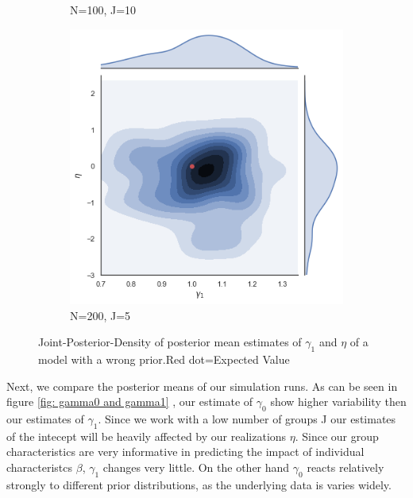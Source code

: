 \begin{figure}[h!]
\begin{subfigure}[b]{0.3\linewidth}
    \caption{N=100, J=10}
  \end{subfigure}
  \begin{subfigure}[b]{0.3\linewidth}
    \includegraphics[width=\linewidth]{graphics/jointplot_gamma1eta_smallJ}
    \caption{ N=200, J=5}
  \end{subfigure}
  \caption{Joint-Posterior-Density of posterior mean estimates of $\gamma_1$ and $\eta$ of a model with a wrong prior.Red dot=Expected Value}
  \label{fig:various sample size}
\end{figure}



Next, we compare the posterior means of our simulation runs. As can be seen in figure \ref{fig: gamma0 and gamma1} , our estimate of $\gamma_0$ show higher variability then our estimates of $\gamma_1$. Since we work with a low number of groups J our estimates of the intecept will be heavily affected by our realizations $\eta$. Since our group characteristics are very informative in predicting the impact of individual characteristcs $\beta$,  $\gamma_1$  changes very little. 
On the other hand $\gamma_0$  reacts relatively strongly to different prior distributions, as the underlying data is varies widely.



